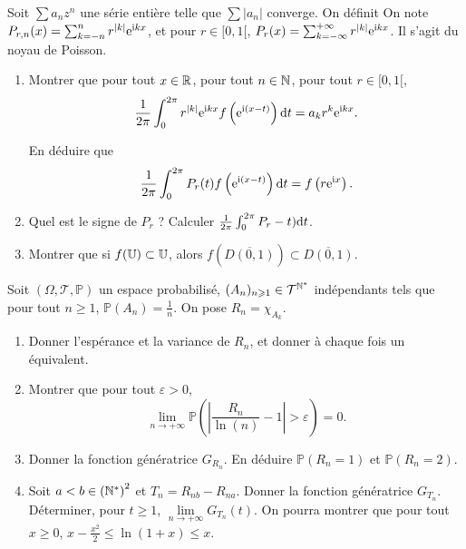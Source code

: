 \documentclass[12pt]{article}
\begin{document}
\begin{exercise}
    Soit $\sum a_n z^{n}$ une série entière telle que $\sum\left\lvert a_n\right\rvert$ converge. On définit 
    On note $P_{r,n}(x)=\sum_{k=-n}^{n}r^{\left\lvert k\right\rvert}\mathrm{e}^{\mathrm{i} kx}$, et pour $r\in[0,1[$, $P_r(x)=\sum_{k=-\infty}^{+\infty}r^{\left\lvert k\right\rvert}\mathrm{e}^{\mathrm{i} kx}$. Il s'agit du noyau de Poisson.

    \begin{enumerate}
        \item Montrer que pour tout $x\in\mathbb{R}$, pour tout $n\in\mathbb{N}$, pour tout $r\in[0,1[$, 
        \begin{equation}
            \frac{1}{2\pi}\int_{0}^{2\pi}r^{\left\lvert k\right\rvert}\mathrm{e}^{\mathrm{i} kx}f\left(\mathrm{e}^{\mathrm{i}(x-t)}\right)\mathrm{d} t=a_k r^{k}\mathrm{e}^{\mathrm{i} kx}.
        \end{equation}
        
        En déduire que
        \begin{equation}
            \frac{1}{2\pi}\int_{0}^{2\pi}P_r(t)f\left(\mathrm{e}^{\mathrm{i}(x-t)}\right)\mathrm{d} t=f\left(r\mathrm{e}^{\mathrm{i} x}\right).
        \end{equation}

        \item Quel est le signe de $P_r$ ? Calculer $\frac{1}{2\pi}\int_{0}^{2\pi}P_r-t)\mathrm{d} t$.
        \item Montrer que si $f(\mathbb{U})\subset\mathbb{U}$, alors $f\left(\overline{D(0,1)}\right)\subset\overline{D(0,1)}$.
    \end{enumerate}
\end{exercise}

\begin{exercise}
    Soit $(\Omega,\mathcal{T},\mathbb{P})$ un espace probabilisé, $(A_n)_{n\geqslant1}\in\mathcal{T}^{\mathbb{N}^{*}}$ indépendants tels que pour tout $n\geqslant1$, $\mathbb{P}\left(A_n\right)=\frac{1}{n}$. On pose $R_n=\chi_{A_{k}}$.
    \begin{enumerate}
        \item Donner l'espérance et la variance de $R_n$, et donner à chaque fois un équivalent.
        \item Montrer que pour tout $\varepsilon>0$, 
        \begin{equation}
            \lim\limits_{n\to+\infty}\mathbb{P}\left(\left\lvert\frac{R_n}{\ln(n)}-1\right\rvert>\varepsilon\right)=0.
        \end{equation}
        \item Donner la fonction génératrice $G_{R_n}$. En déduire $\mathbb{P}(R_n=1)$ et $\mathbb{P}(R_n=2)$.
        \item Soit $a<b\in\left(\mathbb{N}^{*}\right)^{2}$ et $T_n=R_{nb}-R_{na}$. Donner la fonction génératrice $G_{T_n}$. Déterminer, pour $t\geqslant1$, $\lim\limits_{n\to+\infty}G_{T_n}(t)$. On pourra montrer que pour tout $x\geqslant0$, $x-\frac{x^{2}}{2}\leqslant\ln(1+x)\leqslant x$.
    \end{enumerate}
\end{exercise}
\end{document}
